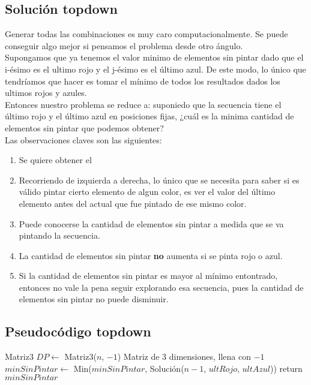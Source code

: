 \subsection{Solución topdown}

Generar todas las combinaciones es muy caro computacionalmente. Se puede conseguir algo mejor si pensamos el problema desde otro ángulo. \\

Supongamos que ya tenemos el valor minimo de elementos sin pintar dado que el i-ésimo es el ultimo rojo y el j-ésimo es el último azul. De este modo, lo único que tendríamos que hacer es tomar el mínimo de todos los resultados dados los ultimos rojos y azules. \\

Entonces nuestro problema se reduce a: suponiedo que la secuencia tiene el último rojo y el último azul en posiciones fijas, ¿cuál es la minima cantidad de elementos sin pintar que podemos obtener? \\

Las observaciones claves son las siguientes:

\begin{enumerate}
\item Se quiere obtener el
\item Recorriendo de izquierda a derecha, lo único que se necesita para saber si es válido pintar cierto elemento de algun color, es ver el valor del último elemento antes del actual que fue pintado de ese mismo color.
\item Puede conocerse la cantidad de elementos sin pintar a medida que se va pintando la secuencia.
\item La cantidad de elementos sin pintar \textbf{no} aumenta si se pinta rojo o azul.
\item Si la cantidad de elementos sin pintar es mayor al mínimo entontrado, entonces no vale la pena seguir explorando esa secuencia, pues la cantidad de elementos sin pintar no puede disminuir.
\end{enumerate}



\subsection{Pseudocódigo topdown}

\begin{algorithm}[H]
\begin{algorithmic}
  \State Matriz3 $DP \gets$ Matriz3($n$, $-1$) \Comment Matriz de 3 dimensiones, llena con $-1$
            \State $minSinPintar \gets$ Min($minSinPintar$, Solución($n-1$, $ultRojo$, $ultAzul$))
        \EndFor
    \EndFor
    \State return $minSinPintar$
\EndProcedure
\end{algorithmic}
\end{algorithm} 


